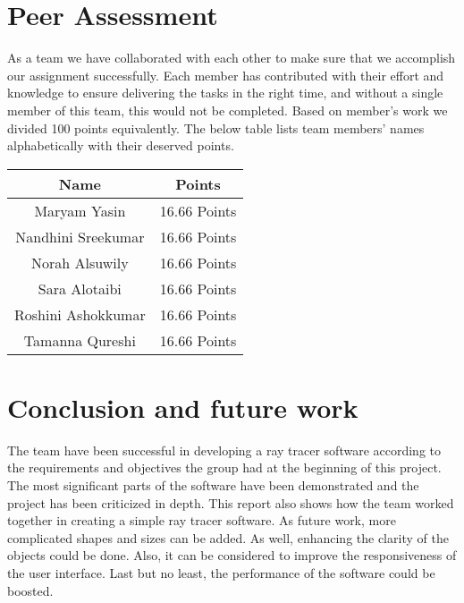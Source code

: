 \documentclass{article}
\begin{document}
\section{Peer Assessment}
As a team we have collaborated with each other to make sure that we accomplish our assignment successfully.  Each member has contributed with their effort and knowledge to ensure delivering the tasks in the right time, and without a single member of this team, this would not be completed. Based on member’s work we divided 100 points equivalently. The below table lists team members' names alphabetically with their deserved points.  

\begin{center}
\begin{tabular}{ |c|c|} 
\hline
\textbf{Name} & \textbf{Points }  \\ 
\hline
Maryam Yasin  & 16.66 Points    \\ 
\hline
Nandhini Sreekumar  &  16.66 Points   \\ 
\hline

Norah Alsuwily  & 16.66 Points  
 \\ 
\hline
Sara Alotaibi & 16.66 Points  \\ 
\hline
Roshini Ashokkumar  &  16.66 Points \\ 
\hline
Tamanna Qureshi  & 16.66 Points  \\ 
\hline

\end{tabular}
\end{center}

\section{Conclusion and future work}

The team have been successful in developing a ray tracer software according to the requirements and objectives the group had at the beginning of this project. The most significant parts of the software have been demonstrated and the project has been criticized in depth. 
This report also shows how the team worked together in creating a simple ray tracer software. 
As future work, more complicated shapes and sizes can be added. As well, enhancing the clarity of the objects could be done. Also, it can be considered to improve the responsiveness of the user interface. Last but no least, the performance of the software could be boosted. 

\newpage
\end{document}

